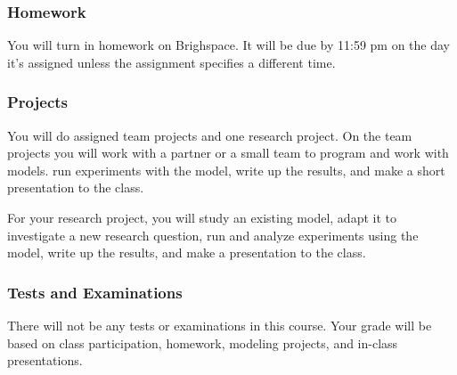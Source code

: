 \documentclass[11pt,twoside]{jgsyllabus}\usepackage[]{graphicx}\usepackage[]{color}
\begin{document}
\subsubsection{Homework}
You will turn in homework on Brighspace. It will be due by 11:59 pm on the day
it's assigned unless the assignment specifies a different time.
%
\subsubsection{Projects}
You will do assigned team projects and one research project.
On the team projects you will work with a partner or a small team to program
and work with models.
run experiments with the model, write up the results, and make a short
presentation to the class.

For your research project, you will study an existing model, adapt it to
investigate a new research question, run and analyze experiments using the
model, write up the results, and make a presentation to the class.

\subsubsection{Tests and Examinations}
There will not be any tests or examinations in this course. Your grade will be
based on class participation, homework, modeling projects, and in-class
presentations.

%
%

\end{document}
